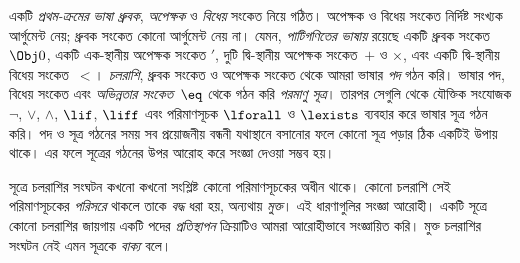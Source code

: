 একটি \emph{প্রথম-ক্রমের ভাষা} \emph{ধ্রুবক}, \emph{অপেক্ষক} ও
\emph{বিধেয়} সংকেত নিয়ে গঠিত। অপেক্ষক ও বিধেয় সংকেত নির্দিষ্ট
সংখ্যক আর্গুমেন্ট নেয়; ধ্রুবক সংকেত কোনো আর্গুমেন্ট নেয় না।
যেমন, \emph{পাটিগণিতের ভাষায়} রয়েছে
একটি ধ্রুবক সংকেত~$\Obj 0$, একটি এক-স্থানীয় অপেক্ষক সংকেত $\prime$,
দুটি দ্বি-স্থানীয় অপেক্ষক সংকেত~$+$ ও $\times$, এবং একটি
দ্বি-স্থানীয় বিধেয় সংকেত~$<$। \emph{চলরাশি}, ধ্রুবক সংকেত ও
অপেক্ষক সংকেত থেকে আমরা ভাষার \emph{পদ} গঠন করি। ভাষার পদ,
বিধেয় সংকেত এবং \emph{অভিন্নতার সংকেত}~$\eq$ থেকে গঠন করি
\emph{পরমাণু সূত্র}। তারপর সেগুলি থেকে যৌক্তিক সংযোজক
$\lnot$, $\lor$, $\land$, $\lif$, $\liff$ এবং পরিমাণসূচক
$\lforall$ ও $\lexists$ ব্যবহার করে ভাষার সূত্র গঠন করি। পদ ও সূত্র
গঠনের সময় সব প্রয়োজনীয় বন্ধনী যথাস্থানে বসানোর ফলে কোনো সূত্র
পড়ার ঠিক একটিই উপায় থাকে। এর ফলে সূত্রের গঠনের উপর আরোহ করে
সংজ্ঞা দেওয়া সম্ভব হয়।

সূত্রে চলরাশির সংঘটন কখনো কখনো সংশ্লিষ্ট কোনো পরিমাণসূচকের অধীন
থাকে। কোনো চলরাশি সেই পরিমাণসূচকের \emph{পরিসরে} থাকলে তাকে
\emph{বদ্ধ} ধরা হয়, অন্যথায় \emph{মুক্ত}। এই ধারণাগুলির
সংজ্ঞা আরোহী। একটি সূত্রে কোনো চলরাশির জায়গায় একটি পদের
\emph{প্রতিস্থাপন} ক্রিয়াটিও আমরা আরোহীভাবে সংজ্ঞায়িত করি।
মুক্ত চলরাশির সংঘটন নেই এমন সূত্রকে \emph{বাক্য} বলে।
